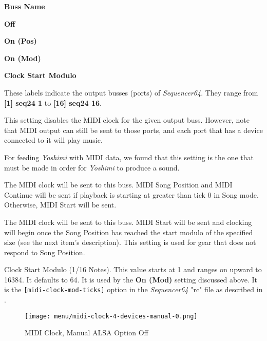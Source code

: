    \begin{enumber}
      \item \textbf{Buss Name}
      \item \textbf{Off}
      \item \textbf{On (Pos)}
      \item \textbf{On (Mod)}
      \item \textbf{Clock Start Modulo}
   \end{enumber}

   \setcounter{ItemCounter}{0}      %

   These labels indicate the output busses (ports) of \textsl{Sequencer64}.
   They range from \textbf{[1] seq24 1} to \textbf{[16] seq24 16}.

   This setting disables the MIDI clock for the given output buss.
   However, note that MIDI output can still be sent to those ports, and
   each port that has a device connected to it will play music.
   
   For feeding \textsl{Yoshimi} with MIDI data, we found that this
   setting is the one that must be made in order for \textsl{Yoshimi} to
   produce a sound.

   The MIDI clock will be sent to this buss.
   MIDI Song Position and MIDI Continue will be sent if playback is starting
   at greater than tick 0 in Song mode.  Otherwise, MIDI Start will be sent.

   The MIDI clock will be sent to this buss.
   MIDI Start will be sent and clocking will begin
   once the Song Position has reached the start modulo of the specified size
   (see the next item's description).
   This setting is used for gear that does not respond to Song Position.

   Clock Start Modulo (1/16 Notes).
   This value starts at 1 and ranges on upward to 16384.
   It  defaults to 64.
   It is used by the \textbf{On (Mod)} setting discussed above.
   It is the \texttt{[midi-clock-mod-ticks]} option in the \textsl{Sequencer64}
   "rc" file as described in
   .

\begin{figure}[H]
   \centering 
   \texttt{[image: menu/midi-clock-4-devices-manual-0.png]}
   \caption{MIDI Clock, Manual ALSA Option Off}
   \label{fig:seq64_midi_clock_4_devices_manual_0}
\end{figure}

